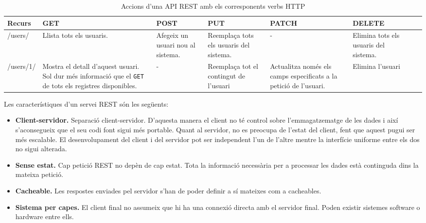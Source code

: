 \begin{table}[h!]
 	\begin{center}
 		\begin{tabularx}{\textwidth}{|l|X|X|X|X|X|X|X|}
  			\hline
 			\bfseries Recurs & \bfseries GET & \bfseries POST & \bfseries PUT & \bfseries PATCH & \bfseries DELETE\\ \hline
			/users/ & Llista tots els usuaris. & Afegeix un usuari nou al sistema. & Reemplaça tots els usuaris del sistema. & - & Elimina tots els usuaris del sistema. \\ \hline
			/users/1/ & Mostra el detall d'aquest usuari. Sol dur més informació que el \texttt{GET} de tots els registres disponibles. & - & Reemplaça tot el contingut de l'usuari & Actualitza només els camps especificats a la petició de l'usuari. & Elimina l'usuari \\ \hline
		\end{tabularx}
	\end{center}
	\label{table:rest_http}
	\caption{Accions d'una \ac{API} \ac{REST} amb els corresponents verbs \ac{HTTP}} 
\end{table}

Les característiques d'un servei \ac{REST} són les següents:
\begin{itemize}
	
	\item \textbf{Client-servidor.} Separació client-servidor. D'aquesta manera el client no té control sobre l'emmagatzematge de les dades i així s'aconsegueix que el seu codi font sigui més portable. Quant al servidor, no es preocupa de l'estat del client, fent que aquest pugui ser més escalable. El desenvolupament del client i del servidor pot ser independent l'un de l'altre mentre la interfície uniforme entre els dos no sigui alterada.
	
	\item \textbf{Sense estat.} Cap petició \ac{REST} no depèn de cap estat. Tota la informació necessària per a processar les dades està continguda dins la mateixa petició.
	
	\item \textbf{Cacheable.} Les respostes enviades pel servidor s'han de poder definir a sí mateixes com a cacheables.
	
	\item \textbf{Sistema per capes.} El client final no assumeix que hi ha una connexió directa amb el servidor final. Poden existir sistemes software o hardware entre ells.
	
\end{itemize}

